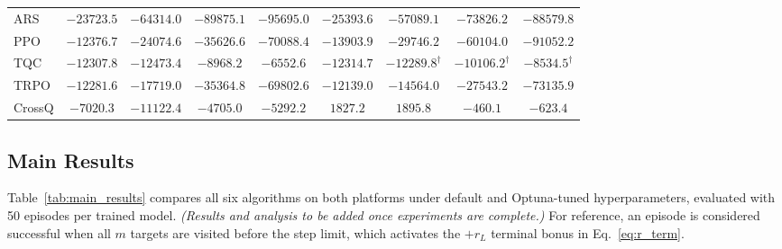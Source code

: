 \documentclass{article}
\begin{document}
\begin{table}[htbp]
{\begin{tabular}{l|cccc|cccc}
    ARS    & $-23723.5$  & $-64314.0$  & $-89875.1$  & $-95695.0$  & $-25393.6$                  & $-57089.1$                  & $-73826.2$                  & $-88579.8$                  \\
    PPO    & $-12376.7$  & $-24074.6$  & $-35626.6$  & $-70088.4$  & $-13903.9$                  & $-29746.2$                  & $-60104.0$                  & $-91052.2$                  \\
    TQC    & $-12307.8$  & $-12473.4$  & $-8968.2$   & $-6552.6$   & $-12314.7$                  & $\mathbf{-12289.8}^\dagger$ & $\mathbf{-10106.2}^\dagger$ & $\mathbf{-8534.5}^\dagger$  \\
    TRPO   & $-12281.6$  & $-17719.0$  & $-35364.8$  & $-69802.6$  & $-12139.0$                  & $-14564.0$                  & $-27543.2$                  & $-73135.9$                  \\
    CrossQ & $-7020.3$   & $-11122.4$  & $-4705.0$   & $-5292.2$  & $1827.2$ & $1895.8$ & $-460.1$ & $-623.4$  \\
    \bottomrule
\end{tabular}}
\vspace{-6pt}
\end{table}

\subsection{Main Results}
\label{sec:exp:main}

Table~\ref{tab:main_results} compares all six algorithms on both platforms under default and Optuna-tuned hyperparameters, evaluated with 50 episodes per trained model. \textit{(Results and analysis to be added once experiments are complete.)} For reference, an episode is considered successful when all $m$ targets are visited before the step limit, which activates the $+r_L$ terminal bonus in Eq.~\eqref{eq:r_term}.

\end{document}
